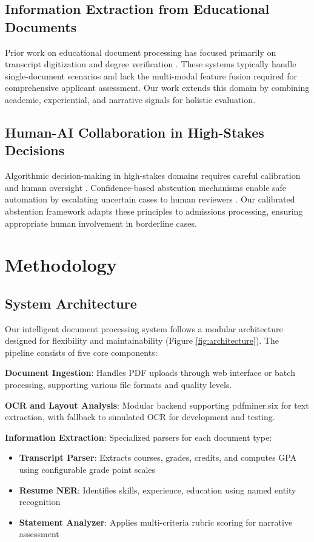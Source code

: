 \documentclass{article}
\begin{document}
\subsection{Information Extraction from Educational Documents}

Prior work on educational document processing has focused primarily on transcript digitization \cite{transcript_parsing_2019} and degree verification \cite{credential_verification_2020}. These systems typically handle single-document scenarios and lack the multi-modal feature fusion required for comprehensive applicant assessment. Our work extends this domain by combining academic, experiential, and narrative signals for holistic evaluation.

\subsection{Human-AI Collaboration in High-Stakes Decisions}

Algorithmic decision-making in high-stakes domains requires careful calibration and human oversight \cite{human_ai_collaboration_2021}. Confidence-based abstention mechanisms enable safe automation by escalating uncertain cases to human reviewers \cite{selective_classification_2010}. Our calibrated abstention framework adapts these principles to admissions processing, ensuring appropriate human involvement in borderline cases.

\section{Methodology}

\subsection{System Architecture}

Our intelligent document processing system follows a modular architecture designed for flexibility and maintainability (Figure \ref{fig:architecture}). The pipeline consists of five core components:

\textbf{Document Ingestion}: Handles PDF uploads through web interface or batch processing, supporting various file formats and quality levels.

\textbf{OCR and Layout Analysis}: Modular backend supporting pdfminer.six for text extraction, with fallback to simulated OCR for development and testing.

\textbf{Information Extraction}: Specialized parsers for each document type:
\begin{itemize}
    \item \textbf{Transcript Parser}: Extracts courses, grades, credits, and computes GPA using configurable grade point scales
    \item \textbf{Resume NER}: Identifies skills, experience, education using named entity recognition
    \item \textbf{Statement Analyzer}: Applies multi-criteria rubric scoring for narrative assessment
\end{itemize}
\end{document}
